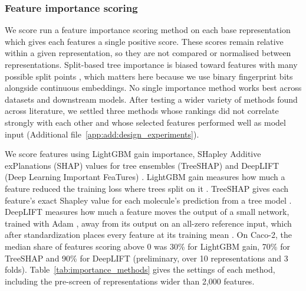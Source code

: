 \subsubsection{Feature importance scoring}

We score run a feature importance scoring method on each base representation which gives each features a single positive score. These scores remain relative within a given representation, so they are not compared or normalised between representations.  Split-based tree importance is biased toward features with many possible split points \citep{Strobl2007}, which matters here because we use binary fingerprint bits alongside continuous embeddings. No single importance method works best across datasets and downstream models. After testing a wider variety of methods found across literature, we settled three methods whose rankings did not correlate strongly with each other and whose selected features performed well as model input (Additional file~\ref{app:add:design_experiments}).

We score features using LightGBM gain importance, SHapley Additive exPlanations (SHAP) values for tree ensembles (TreeSHAP) and DeepLIFT (Deep Learning Important FeaTures) \citep{Shrikumar2017}. LightGBM gain measures how much a feature reduced the training loss where trees split on it \citep{ke2017lightgbm}. TreeSHAP gives each feature's exact Shapley value for each molecule's prediction from a tree model \citep{Lundberg2020}. DeepLIFT measures how much a feature moves the output of a small network, trained with Adam \citep{Kingma2015}, away from its output on an all-zero reference input, which after standardization places every feature at its training mean \citep{Shrikumar2017, Kokhlikyan2020, Ancona2018}. On Caco-2, the median share of features scoring above 0 was 30\% for LightGBM gain, 70\% for TreeSHAP and 90\% for DeepLIFT (preliminary, over 10 representations and 3 folds). Table~\ref{tab:importance_methods} gives the settings of each method, including the pre-screen of representations wider than 2,000 features.

